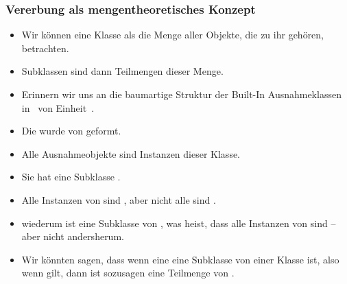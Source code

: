 \documentclass[aspectratio=169,mathserif,notheorems]{beamer}%
\begin{document}
\begin{frame}%
\frametitle{Vererbung als mengentheoretisches Konzept}%
\begin{itemize}%
%
%
\item<2-> Wir können eine Klasse als die Menge aller Objekte, die zu ihr gehören, betrachten.%
%
\item<3-> Subklassen sind dann Teilmengen dieser Menge.%
%
\item<4-> Erinnern wir uns an die baumartige Struktur der Built-In Ausnahmeklassen in \python\ von Einheit~\unitBuiltInExceptions.%
%
\item<5-> Die  wurde von  geformt.%
%
\item<6-> Alle Ausnahmeobjekte sind Instanzen dieser Klasse.%
%
\item<7-> Sie hat eine Subklasse .%
%
\item<8-> Alle Instanzen von  sind , aber nicht alle  sind .%
%
\item<9->  wiederum ist eine Subklasse von , was heist, dass alle  Instanzen von  sind -- aber nicht andersherum.%
%
\item<10-> Wir könnten sagen, dass wenn eine  eine Subklasse von einer Klasse  ist, also wenn  gilt, dann ist  sozusagen eine Teilmenge von .%
\end{itemize}%
%
%
\end{frame}%
%
\end{document}
